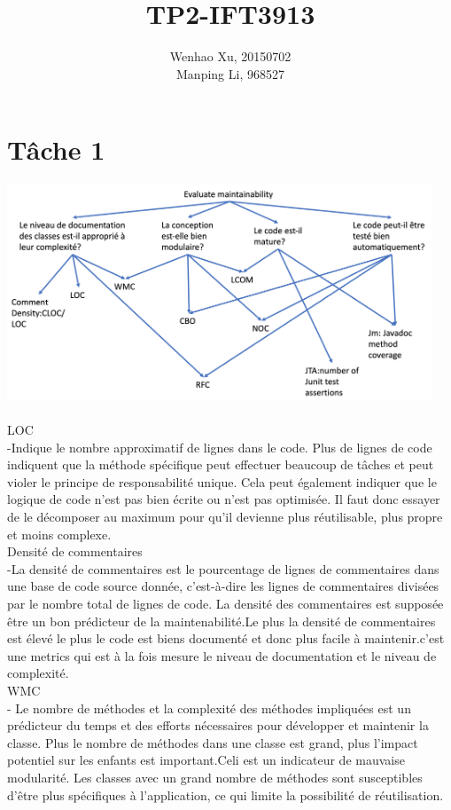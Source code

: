 \documentclass{article}
\title{TP2-IFT3913}
\author{Wenhao Xu, 20150702\\Manping Li, 968527}
\date{}
\begin{document}
\maketitle

\section*{Tâche 1}

\includegraphics[width=0.95\textwidth]{GQM.png}\cite{ref 1 }\\\\
LOC\\
-Indique le nombre approximatif de lignes dans le code. Plus de lignes de code indiquent que la méthode spécifique peut effectuer beaucoup de tâches et peut violer le principe de responsabilité unique. Cela peut également indiquer que le logique de code n'est pas bien écrite ou n'est pas optimisée. Il faut donc essayer de le décomposer au maximum pour qu'il devienne plus réutilisable, plus propre et moins complexe.\\
Densité de commentaires\\
-La densité de commentaires est le pourcentage de lignes de commentaires dans une base de code source donnée, c'est-à-dire les lignes de commentaires divisées par le nombre total de lignes de code. La densité des commentaires est supposée être un bon prédicteur de la maintenabilité.Le plus la densité de commentaires est élevé le plus le code est biens documenté et donc plus facile à maintenir.c'est une metrics qui est à la fois mesure le niveau de documentation et le niveau de complexité.\\
WMC\\
- Le nombre de méthodes et la complexité des méthodes impliquées est un prédicteur du temps et des efforts nécessaires pour développer et maintenir la classe. Plus le nombre de méthodes dans une classe est grand, plus l'impact potentiel sur les enfants est important.Celi est un indicateur de mauvaise modularité. Les classes avec un grand nombre de méthodes sont susceptibles d'être plus spécifiques à l'application, ce qui limite la possibilité de réutilisation.\\
\end{document}
